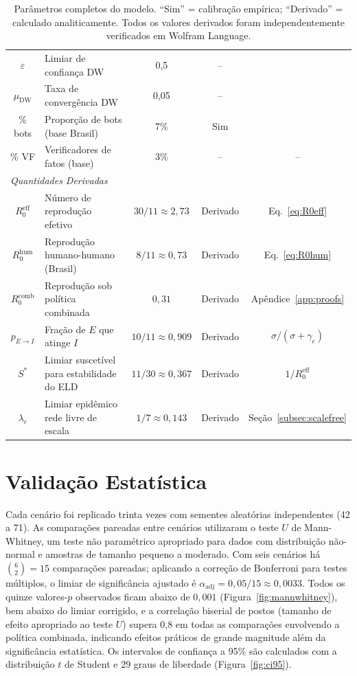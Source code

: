 \documentclass[12pt,a4paper]{article}
\theoremstyle{definition}
\theoremstyle{plain}
\begin{document}
\begin{table}[H]
{\begin{tabular}{clccc}
$\varepsilon$ & Limiar de confiança DW & 0,5 & -- & \citet{deffuant2000mixing} \\
$\mu_{\text{DW}}$ & Taxa de convergência DW & 0,05 & -- & \citet{deffuant2000mixing} \\
\% bots & Proporção de bots (base Brasil) & 7\% & Sim & \citet{ruediger2018bots} \\
\% VF & Verificadores de fatos (base) & 3\% & -- & -- \\
\midrule
\multicolumn{5}{l}{\textit{Quantidades Derivadas}} \\
$R_0^{\text{eff}}$ & Número de reprodução efetivo & $30/11 \approx 2{,}73$ & Derivado & Eq.~\eqref{eq:R0eff} \\
$R_0^{\text{hum}}$ & Reprodução humano-humano (Brasil) & $8/11 \approx 0{,}73$ & Derivado & Eq.~\eqref{eq:R0hum} \\
$R_0^{\text{comb}}$ & Reprodução sob política combinada & $0{,}31$ & Derivado & Apêndice~\ref{app:proofs} \\
$p_{E \to I}$ & Fração de $E$ que atinge $I$ & $10/11 \approx 0{,}909$ & Derivado & $\sigma/(\sigma+\gamma_e)$ \\
$S^*$ & Limiar suscetível para estabilidade do ELD & $11/30 \approx 0{,}367$ & Derivado & $1/R_0^{\text{eff}}$ \\
$\lambda_c$ & Limiar epidêmico rede livre de escala & $1/7 \approx 0{,}143$ & Derivado & Seção~\ref{subsec:scalefree} \\
\bottomrule
\end{tabular}%
}
\caption{Parâmetros completos do modelo. ``Sim'' = calibração empírica; ``Derivado'' = calculado analiticamente. Todos os valores derivados foram independentemente verificados em Wolfram Language.}
\label{tab:parameters}
\end{table}

\section{Validação Estatística}
\label{app:statistics}

Cada cenário foi replicado trinta vezes com sementes aleatórias independentes (42 a 71). As comparações pareadas entre cenários utilizaram o teste $U$ de Mann-Whitney, um teste não paramétrico apropriado para dados com distribuição não-normal e amostras de tamanho pequeno a moderado. Com seis cenários há $\binom{6}{2} = 15$ comparações pareadas; aplicando a correção de Bonferroni para testes múltiplos, o limiar de significância ajustado é $\alpha_{\text{adj}} = 0{,}05/15 \approx 0{,}0033$. Todos os quinze valores-$p$ observados ficam abaixo de $0{,}001$ (Figura~\ref{fig:mannwhitney}), bem abaixo do limiar corrigido, e a correlação biserial de postos (tamanho de efeito apropriado ao teste $U$) supera 0,8 em todas as comparações envolvendo a política combinada, indicando efeitos práticos de grande magnitude além da significância estatística. Os intervalos de confiança a 95\% são calculados com a distribuição $t$ de Student e 29 graus de liberdade (Figura~\ref{fig:ci95}).
\end{document}
